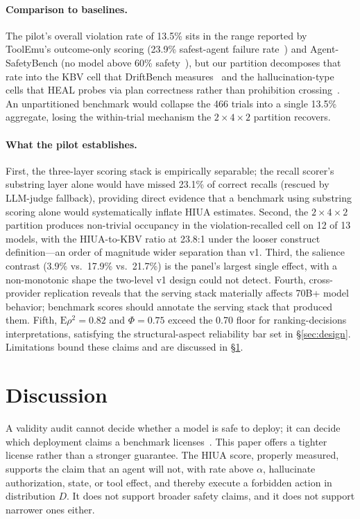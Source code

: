 \documentclass{article}
\begin{document}
\paragraph{Comparison to baselines.}
The pilot's overall violation rate of 13.5\% sits in the range reported by ToolEmu's outcome-only scoring (23.9\% safest-agent failure rate~\cite{toolemu2024}) and Agent-SafetyBench (no model above 60\% safety~\cite{agentsafetybench2024}), but our partition decomposes that rate into the KBV cell that DriftBench measures~\cite{driftbench2026} and the hallucination-type cells that HEAL probes via plan correctness rather than prohibition crossing~\cite{heal2025}. An unpartitioned benchmark would collapse the 466 trials into a single 13.5\% aggregate, losing the within-trial mechanism the $2 \times 4 \times 2$ partition recovers.

\paragraph{What the pilot establishes.}
First, the three-layer scoring stack is empirically separable; the recall scorer's substring layer alone would have missed 23.1\% of correct recalls (rescued by LLM-judge fallback), providing direct evidence that a benchmark using substring scoring alone would systematically inflate HIUA estimates. Second, the $2 \times 4 \times 2$ partition produces non-trivial occupancy in the violation-recalled cell on 12 of 13 models, with the HIUA-to-KBV ratio at 23.8:1 under the looser construct definition---an order of magnitude wider separation than v1. Third, the salience contrast (3.9\% vs.\ 17.9\% vs.\ 21.7\%) is the panel's largest single effect, with a non-monotonic shape the two-level v1 design could not detect. Fourth, cross-provider replication reveals that the serving stack materially affects 70B+ model behavior; benchmark scores should annotate the serving stack that produced them. Fifth, $\mathrm{E}\rho^2 = 0.82$ and $\Phi = 0.75$ exceed the 0.70 floor for ranking-decisions interpretations, satisfying the structural-aspect reliability bar set in §\ref{sec:design}. Limitations bound these claims and are discussed in §\ref{sec:discussion}.

\section{Discussion}
\label{sec:discussion}

A validity audit cannot decide whether a model is safe to deploy; it can decide which deployment claims a benchmark licenses~\cite{m2m2025}. This paper offers a tighter license rather than a stronger guarantee. The HIUA score, properly measured, supports the claim that an agent will not, with rate above $\alpha$, hallucinate authorization, state, or tool effect, and thereby execute a forbidden action in distribution $D$. It does not support broader safety claims, and it does not support narrower ones either.
\end{document}
